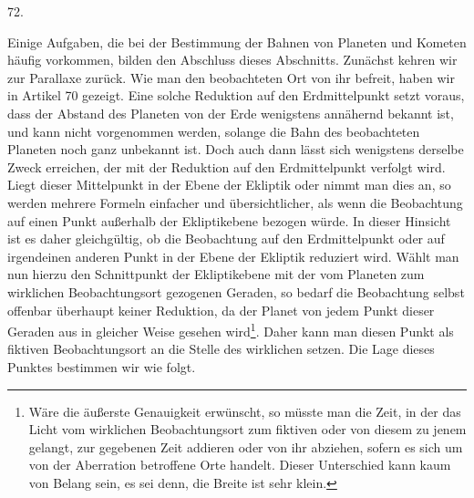 \par{}\medskip
\hypertarget{native-094-article072}{}
\begin{center}72.\end{center}
Einige Aufgaben, die bei der Bestimmung der Bahnen von Planeten und Kometen häufig vorkommen, bilden den Abschluss dieses Abschnitts. Zunächst kehren wir zur Parallaxe zurück. Wie man den beobachteten Ort von ihr befreit, haben wir in Artikel 70 gezeigt. Eine solche Reduktion auf den Erdmittelpunkt setzt voraus, dass der Abstand des Planeten von der Erde wenigstens annähernd bekannt ist, und kann nicht vorgenommen werden, solange die Bahn des beobachteten Planeten noch ganz unbekannt ist. Doch auch dann lässt sich wenigstens derselbe Zweck erreichen, der mit der Reduktion auf den Erdmittelpunkt verfolgt wird. Liegt dieser Mittelpunkt in der Ebene der Ekliptik oder nimmt man dies an, so werden mehrere Formeln einfacher und übersichtlicher, als wenn die Beobachtung auf einen Punkt außerhalb der Ekliptikebene bezogen würde. In dieser Hinsicht ist es daher gleichgültig, ob die Beobachtung auf den Erdmittelpunkt oder auf irgendeinen anderen Punkt in der Ebene der Ekliptik reduziert wird. Wählt man nun hierzu den Schnittpunkt der Ekliptikebene mit der vom Planeten zum wirklichen Beobachtungsort gezogenen Geraden, so bedarf die Beobachtung selbst offenbar überhaupt keiner Reduktion, da der Planet von jedem Punkt dieser Geraden aus in gleicher Weise gesehen wird\footnote{Wäre die äußerste Genauigkeit erwünscht, so müsste man die Zeit, in der das Licht vom wirklichen Beobachtungsort zum fiktiven oder von diesem zu jenem gelangt, zur gegebenen Zeit addieren oder von ihr abziehen, sofern es sich um von der Aberration betroffene Orte handelt. Dieser Unterschied kann kaum von Belang sein, es sei denn, die Breite ist sehr klein.}. Daher kann man diesen Punkt als fiktiven Beobachtungsort an die Stelle des wirklichen setzen. Die Lage dieses Punktes bestimmen wir wie folgt.

